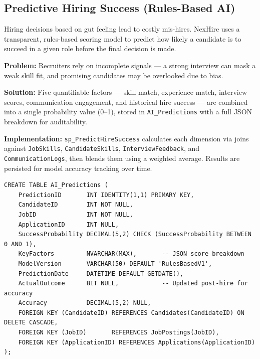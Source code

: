 \documentclass[11pt,a4paper]{article}
\begin{document}
\subsection{Predictive Hiring Success (Rules-Based AI)}

\noindent
Hiring decisions based on gut feeling lead to costly mis-hires. NexHire uses a transparent, rules-based scoring model to predict how likely a candidate is to succeed in a given role before the final decision is made.

\textbf{Problem:} Recruiters rely on incomplete signals --- a strong interview can mask a weak skill fit, and promising candidates may be overlooked due to bias.

\textbf{Solution:} Five quantifiable factors --- skill match, experience match, interview scores, communication engagement, and historical hire success --- are combined into a single probability value (0--1), stored in \texttt{AI\_Predictions} with a full JSON breakdown for auditability.

\textbf{Implementation:} \texttt{sp\_PredictHireSuccess} calculates each dimension via joins against \texttt{JobSkills}, \texttt{CandidateSkills}, \texttt{InterviewFeedback}, and \texttt{CommunicationLogs}, then blends them using a weighted average. Results are persisted for model accuracy tracking over time.

\begin{verbatim}
CREATE TABLE AI_Predictions (
    PredictionID       INT IDENTITY(1,1) PRIMARY KEY,
    CandidateID        INT NOT NULL,
    JobID              INT NOT NULL,
    ApplicationID      INT NULL,
    SuccessProbability DECIMAL(5,2) CHECK (SuccessProbability BETWEEN 0 AND 1),
    KeyFactors         NVARCHAR(MAX),       -- JSON score breakdown
    ModelVersion       VARCHAR(50) DEFAULT 'RulesBasedV1',
    PredictionDate     DATETIME DEFAULT GETDATE(),
    ActualOutcome      BIT NULL,            -- Updated post-hire for accuracy
    Accuracy           DECIMAL(5,2) NULL,
    FOREIGN KEY (CandidateID) REFERENCES Candidates(CandidateID) ON DELETE CASCADE,
    FOREIGN KEY (JobID)       REFERENCES JobPostings(JobID),
    FOREIGN KEY (ApplicationID) REFERENCES Applications(ApplicationID)
);
\end{verbatim}
\end{document}
